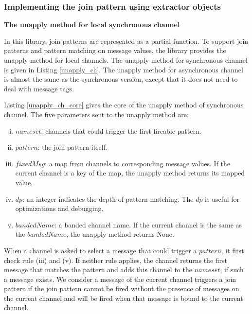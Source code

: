 \subsubsection{Implementing the join pattern using extractor objects}

{\bf{The unapply method for local synchronous channel}}

In this library, join patterns are represented as a partial function.  To support join patterns and pattern matching on message values, the library provides the unapply method for local channels.  The unapply method for synchronous channel is given in Listing \ref{unapply_ch}.    The unapply method for asynchronous channel is almost the same as the synchronous version, except that it does not need to deal with message tags.

Listing \ref{unapply_ch_core} gives the core of the unapply method of synchronous channel.  The five parameters sent to the unapply method are:

\begin{enumerate} [(i)]
  \item $nameset$: channels that could trigger the first fireable pattern.
  \item $pattern$: the join pattern itself.
  \item $fixedMsg$: a map from channels to corresponding message values.  If the current channel is a key of the map, the unapply method returns its mapped value.
  \item $dp$: an integer indicates the depth of pattern matching.  The $dp$ is useful for optimizations and debugging.
  \item $bandedName$: a banded channel name.  If the current channel is the same as the $bandedName$, the unapply method returns None.
\end{enumerate}

When a channel is asked to select a message that could trigger a $pattern$, it first check rule (iii) and (v).  If neither rule applies, the channel returns the first message that matches the pattern and adds this channel to the $nameset$, if such a message exists.  We consider a message of the current channel triggers a join pattern if the join pattern cannot be fired without the presence of messages on the current channel and will be fired when that message is bound to the current channel.

